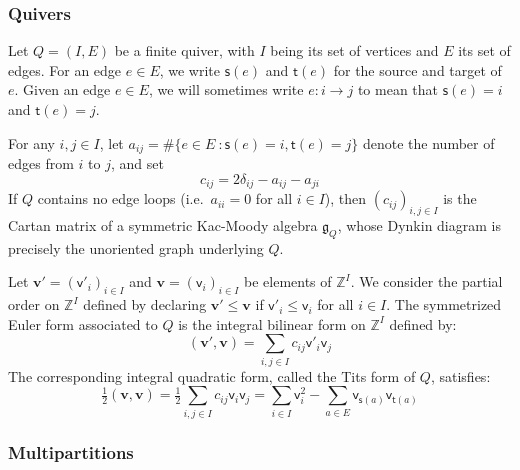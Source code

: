 \documentclass[11pt,reqno]{amsart}
\renewcommand{\mathbf}{\mathbold}
\numberwithin{equation}{section}
\theoremstyle{definition}
\newcommand{\fg}{\mathfrak{g}}
\newcommand{\bv}{\mathbf{v}}
\newcommand{\ZZ}{\mathbb{Z}}
\renewcommand{\bv}{\mathbf{v}} %
\newcommand{\sv}{\mathsf{v}}
\newcommand{\source}{\mathsf{s}}
\newcommand{\target}{\mathsf{t}}
\newcommand{\vertexset}{I}
\newcommand{\arrowset}{E}
\begin{document}

\subsubsection{Quivers}
\label{sec: quivers}
Let $Q = (\vertexset, \arrowset)$ be a finite quiver, with $\vertexset$ being its set of vertices and $\arrowset$ its set of edges. For an edge $e \in E$, we write $\source(e)$ and $\target(e)$ for the source and target of $e$. Given an edge $e \in E$, we will sometimes write $e : i \rightarrow j$ to mean that $\source(e) = i$ and $\target(e) = j$.

For any $i,j \in \vertexset$, let $a_{ij} = \#\{ e \in \arrowset \ : \source(e) = i, \target(e) = j\}$ denote the number of edges from $i$ to $j$, and set
\begin{equation}
c_{ij} = 2\delta_{ij} - a_{ij} - a_{ji}
\end{equation}
If $Q$ contains no edge loops (i.e.~$a_{ii} = 0$ for all $i\in\vertexset$), then $(c_{ij})_{i,j \in \vertexset}$ is the Cartan matrix of a symmetric Kac-Moody algebra $\fg_Q$, whose Dynkin diagram is precisely the unoriented graph underlying $Q$. 

Let $\bv' = (\sv'_i)_{i \in \vertexset}$ and $ \bv = (\sv_i)_{i \in \vertexset}$ be elements of $\ZZ^\vertexset$. We consider the partial order on $\ZZ^\vertexset$ defined by declaring $\bv' \leq \bv$ if $\sv'_i \leq \sv_i $ for all $ i \in \vertexset$.  The symmetrized Euler form associated to $Q$ is the integral bilinear form on $\ZZ^\vertexset$ defined by:
\begin{equation}
\label{eq: Euler form}
(\bv', \bv) = \sum_{i,j \in \vertexset} c_{ij} \sv'_i \sv_j
\end{equation}
The corresponding integral quadratic form, called the Tits form of $Q$, satisfies:
$$
\tfrac{1}{2}(\bv, \bv)   = \tfrac{1}{2} \sum_{i,j \in \vertexset} c_{ij} \sv_i \sv_j  =  \sum_{i \in \vertexset} \sv^2_i  - \sum_{a \in \arrowset} \sv_{\source(a)} \sv_{\target(a)}
$$


\subsubsection{Multipartitions}
\end{document}
